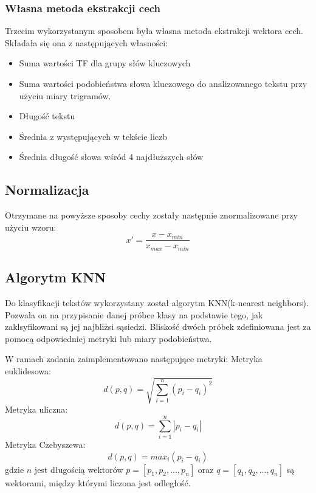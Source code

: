 \documentclass{classrep}
\begin{document}
\subsubsection{Własna metoda ekstrakcji cech}
Trzecim wykorzystanym sposobem była własna metoda ekstrakcji wektora cech. Składała się ona z następujących własności:
\begin{itemize}
	\item Suma wartości TF dla grupy słów kluczowych
	\item Suma wartości podobieństwa słowa kluczowego do analizowanego tekstu przy użyciu miary trigramów.
	\item Długość tekstu
	\item Średnia z występujących w tekście liczb
	\item Średnia długość słowa wśród 4 najdłuższych słów
\end{itemize}


\subsection{Normalizacja}
Otrzymane na powyższe sposoby cechy zostały następnie znormalizowane przy użyciu wzoru:
\begin{equation}
x' = \frac{x-x_{min}}{x_{max}-x_{min}}
\end{equation}

\subsection{Algorytm KNN}
Do klasyfikacji tekstów wykorzystany został algorytm KNN(k-nearest neighbors). Pozwala on na przypisanie danej próbce klasy na podstawie tego, jak zaklsyfikowani są jej najbliżsi sąsiedzi. Bliskość dwóch próbek zdefiniowana jest za pomocą odpowiedniej metryki lub miary podobieństwa. 

W ramach zadania zaimplementowano następujące metryki: \newline
Metryka euklidesowa:
\begin{equation}
d(p,q) = \sqrt{\sum_{i=1}^{n} (p_{i} -q_{i})^{2}}
\end{equation}
Metryka uliczna:
\begin{equation}
d(p,q) = \sum_{i=1}^{n} |p_{i} -q_{i}|
\end{equation}
Metryka Czebyszewa:
\begin{equation}
d(p,q) = max_{i}(p_{i} -q_{i})
\end{equation}
gdzie \(n\) jest długością wektorów \(p = [p_{1}, p_{2}, ..., p_{n}]\) oraz \(q = [q_{1}, q_{2}, ..., q_{n}]\) są wektorami, między którymi liczona jest odległość. 
\end{document}
